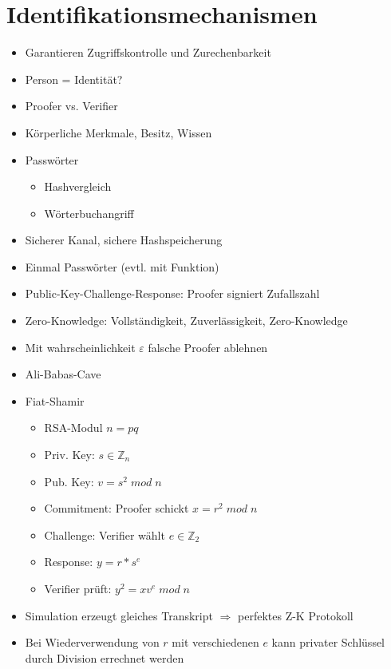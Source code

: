 \documentclass[11pt, paper=a4, twocolumn]{scrartcl}
\newcommand*{\Z}{\mathbb{Z}}
\begin{document}
	\section{Identifikationsmechanismen}
		\begin{itemize}
			\item Garantieren Zugriffskontrolle und Zurechenbarkeit
			\item Person = Identität?
			\item Proofer vs. Verifier
			\item Körperliche Merkmale, Besitz, Wissen
			\item Passwörter
				\begin{itemize}
					\item Hashvergleich
					\item Wörterbuchangriff
				\end{itemize}
			\item Sicherer Kanal, sichere Hashspeicherung
			\item Einmal Passwörter (evtl. mit Funktion)
			\item Public-Key-Challenge-Response: Proofer signiert Zufallszahl
			\item Zero-Knowledge: Vollständigkeit, Zuverlässigkeit, Zero-Knowledge
			\item Mit wahrscheinlichkeit $\varepsilon$ falsche Proofer ablehnen
			\item Ali-Babas-Cave
			\item Fiat-Shamir
				\begin{itemize}
					\item RSA-Modul $n=pq$
					\item Priv. Key: $s\in\Z_n$
					\item Pub. Key: $v=s^2\;mod\;n$
					\item Commitment: Proofer schickt $x=r^2\;mod\;n$
					\item Challenge: Verifier wählt $e\in\Z_2$
					\item Response: $y=r*s^e$
					\item Verifier prüft: $y^2=xv^e\;mod\;n$
				\end{itemize} 
			\item Simulation erzeugt gleiches Transkript $\Rightarrow$ perfektes Z-K Protokoll
			\item Bei Wiederverwendung von $r$ mit verschiedenen $e$ kann privater Schlüssel durch Division errechnet werden
		\end{itemize}
	
\end{document}

